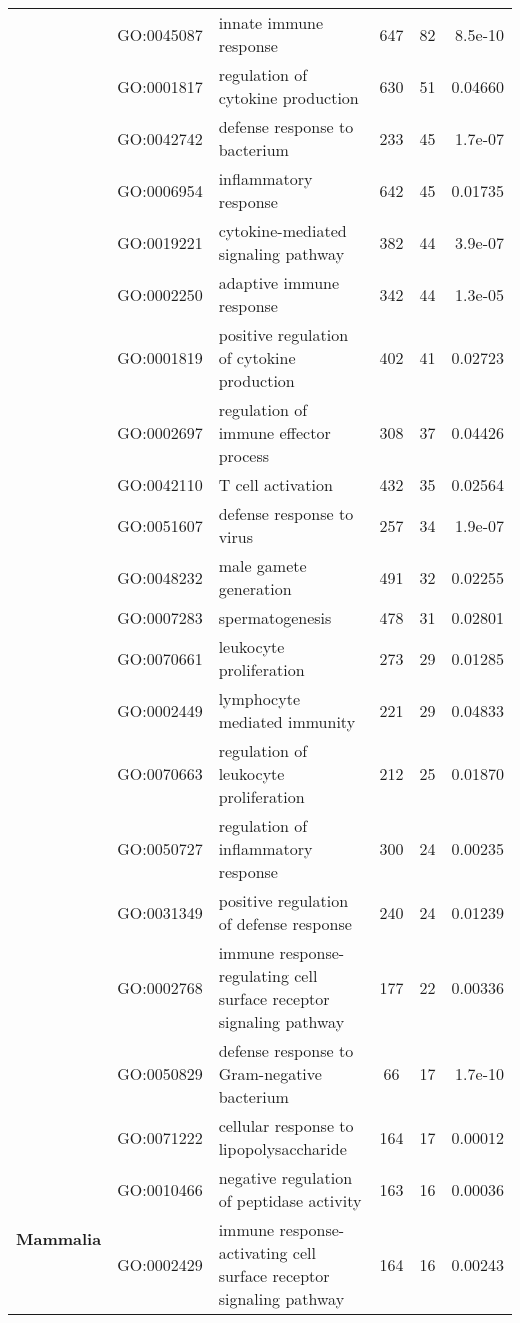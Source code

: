 \documentclass[../main.tex]{subfiles}
\begin{document}
\begin{landscape}
\begin{longtable}{@{}lllccr@{}}
     & GO:0045087 & innate immune response & 647 & 82 & 8.5e-10 \\
     & GO:0001817 & regulation of cytokine production & 630 & 51 & 0.04660 \\
     & GO:0042742 & defense response to bacterium & 233 & 45 & 1.7e-07 \\
     & GO:0006954 & inflammatory response & 642 & 45 & 0.01735 \\
     & GO:0019221 & cytokine-mediated signaling pathway & 382 & 44 & 3.9e-07 \\
     & GO:0002250 & adaptive immune response & 342 & 44 & 1.3e-05 \\
     & GO:0001819 & positive regulation of cytokine production & 402 & 41 & 0.02723 \\
     & GO:0002697 & regulation of immune effector process & 308 & 37 & 0.04426 \\
     & GO:0042110 & T cell activation & 432 & 35 & 0.02564 \\
     & GO:0051607 & defense response to virus & 257 & 34 & 1.9e-07 \\
     & GO:0048232 & male gamete generation & 491 & 32 & 0.02255 \\
     & GO:0007283 & spermatogenesis & 478 & 31 & 0.02801 \\
     & GO:0070661 & leukocyte proliferation & 273 & 29 & 0.01285 \\
     & GO:0002449 & lymphocyte mediated immunity & 221 & 29 & 0.04833 \\
     & GO:0070663 & regulation of leukocyte proliferation & 212 & 25 & 0.01870 \\
     & GO:0050727 & regulation of inflammatory response & 300 & 24 & 0.00235 \\
     & GO:0031349 & positive regulation of defense response & 240 & 24 & 0.01239 \\
     & GO:0002768 & immune response-regulating cell surface receptor signaling pathway & 177 & 22 & 0.00336 \\
     & GO:0050829 & defense response to Gram-negative bacterium & 66 & 17 & 1.7e-10 \\
     & GO:0071222 & cellular response to lipopolysaccharide & 164 & 17 & 0.00012 \\
     \multirow{13}{*}{\textbf{Mammalia}} & GO:0010466 & negative regulation of peptidase activity & 163 & 16 & 0.00036 \\
     & GO:0002429 & immune response-activating cell surface receptor signaling pathway & 164 & 16 & 0.00243 \\

\end{longtable}
\end{landscape}
\end{document}
